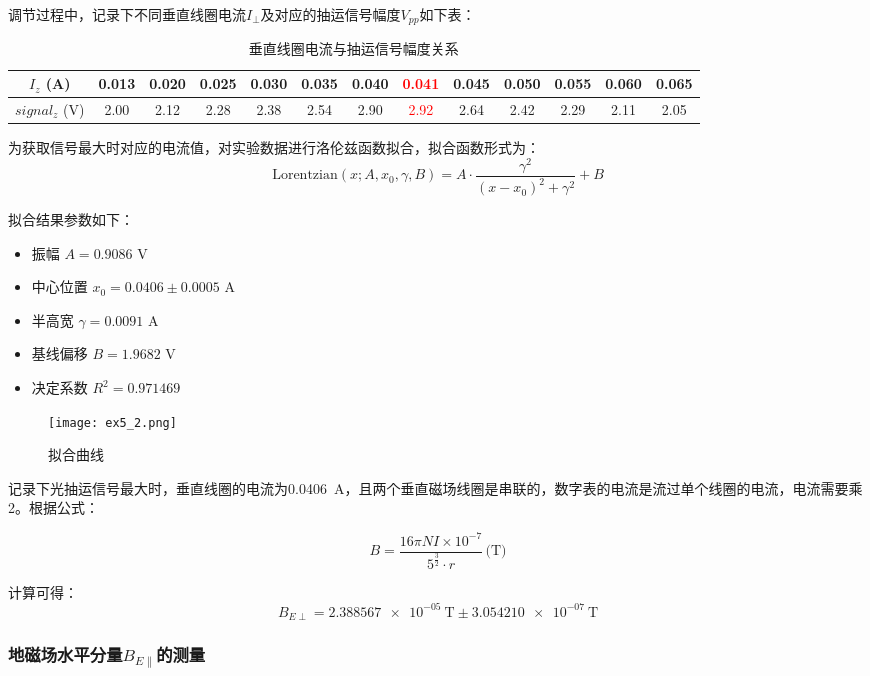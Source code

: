 调节过程中，记录下不同垂直线圈电流$I_{\perp}$及对应的抽运信号幅度$V_{pp}$如下表：

\begin{table}[h]
\centering
\caption{垂直线圈电流与抽运信号幅度关系}
\label{tab:data_horizontal}
\begin{tabular}{*{13}{c}}
\toprule

$I_z$ (\si{\ampere})&0.013 & 0.020 & 0.025 & 0.030 & 0.035 & 0.040 & \textcolor{red}{0.041} & 0.045 & 0.050 & 0.055 & 0.060 & 0.065  \\
\midrule
$signal_z$ (V)&2.00 & 2.12 & 2.28 & 2.38 & 2.54 & 2.90 & \textcolor{red}{2.92} & 2.64 & 2.42 & 2.29 & 2.11 & 2.05  \\
\bottomrule
\end{tabular}
\end{table}



为获取信号最大时对应的电流值，对实验数据进行洛伦兹函数拟合，拟合函数形式为：
$$ \text{Lorentzian}(x; A, x_0, \gamma, B) = A \cdot \frac{\gamma^2}{(x - x_0)^2 + \gamma^2} + B $$

拟合结果参数如下：
\begin{itemize}
\item 振幅 $A = 0.9086$ V
\item 中心位置 $x_0 = 0.0406 \pm 0.0005$ \si{\ampere}
\item 半高宽 $\gamma = 0.0091$ \si{\ampere}
\item 基线偏移 $B = 1.9682$ V
\item 决定系数 $R^2 = 0.971469$
\end{itemize}
\begin{figure}[{H}]
    \centering
    \texttt{[image: ex5\_2.png]}
    \caption{拟合曲线}
    \label{}
\end{figure}

记录下光抽运信号最大时，垂直线圈的电流为\SI{0.0406}{\ampere}，且两个垂直磁场线圈是串联的，数字表的电流是流过单个线圈的电流，电流需要乘2。根据公式：

$$ B = \frac{16\pi NI \times 10^{-7}}{5^{\frac{3}{2}} \cdot r} \, \text{(T)} $$

计算可得：
$$ B_{E\perp} = \SI{2.388567e-05}{\tesla} \pm \SI{3.054210e-07}{\tesla}$$

\subsubsection{地磁场水平分量$B_{E\parallel}$的测量}

